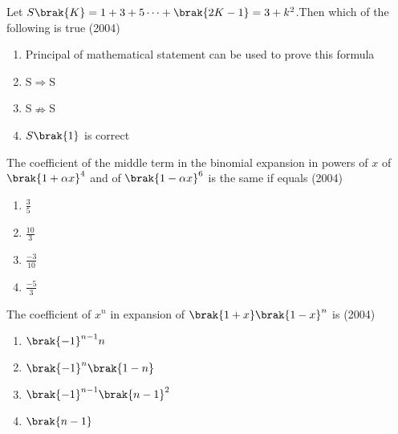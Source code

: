 
\iffalse
  \title{Assignment 1}
  \author{Jadhav Rajesh}
  \section{mains}
\fi

        \item Let $S\brak{K}=1+3+5\dots+\brak{2K-1}=3+k^2$.Then which of the following 
              is true
              \hfill(2004)
    \begin{enumerate}
        \item Principal of mathematical statement can be used to prove this formula\\
        \item S$\Rightarrow$S\\
        \item S$\nRightarrow$S\\
        \item $S\brak{1}$ is correct\\
    \end{enumerate}
    \item The coefficient of the middle term in the binomial expansion in powers of $x$ of $\brak{1+\alpha x}^{4}$ and of $\brak{1-\alpha x}^6$ is the same if equals
         \hfill(2004)
    \begin{enumerate}
         \item$\frac{3}{5}$\\
         \item$\frac{10}{3}$\\
         \item$\frac{-3}{10}$\\
         \item$\frac{-5}{3}$\\
    \end{enumerate}
    \item The coefficient of $x^{n}$ in expansion of $\brak{1+x}\brak{1-x}^{n}$ is
         \hfill(2004)
    \begin{enumerate}
        \item$\brak{-1}^{n-1}n$\\
        \item$\brak{-1}^{n}\brak{1-n}$\\
        \item$\brak{-1}^{n-1}\brak{n-1}^{2}$\\
        \item$\brak{n-1}$\\
    \end{enumerate}
